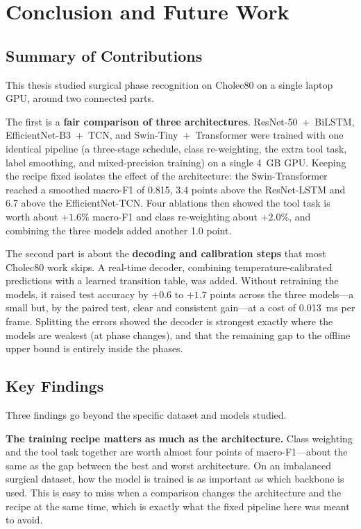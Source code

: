 \chapter{Conclusion and Future Work}

\section{Summary of Contributions}

This thesis studied surgical phase recognition on Cholec80 on a single laptop GPU, around two connected parts.

The first is a \textbf{fair comparison of three architectures}. ResNet-50~+~BiLSTM, EfficientNet-B3~+~TCN, and Swin-Tiny~+~Transformer were trained with one identical pipeline (a three-stage schedule, class re-weighting, the extra tool task, label smoothing, and mixed-precision training) on a single 4~GB GPU. Keeping the recipe fixed isolates the effect of the architecture: the Swin-Transformer reached a smoothed macro-F1 of 0.815, 3.4 points above the ResNet-LSTM and 6.7 above the EfficientNet-TCN. Four ablations then showed the tool task is worth about $+1.6\%$ macro-F1 and class re-weighting about $+2.0\%$, and combining the three models added another 1.0 point.

The second part is about the \textbf{decoding and calibration steps} that most Cholec80 work skips. A real-time decoder, combining temperature-calibrated predictions with a learned transition table, was added. Without retraining the models, it raised test accuracy by $+0.6$ to $+1.7$ points across the three models---a small but, by the paired test, clear and consistent gain---at a cost of 0.013~ms per frame. Splitting the errors showed the decoder is strongest exactly where the models are weakest (at phase changes), and that the remaining gap to the offline upper bound is entirely inside the phases.

\section{Key Findings}

Three findings go beyond the specific dataset and models studied.

\textbf{The training recipe matters as much as the architecture.} Class weighting and the tool task together are worth almost four points of macro-F1---about the same as the gap between the best and worst architecture. On an imbalanced surgical dataset, how the model is trained is as important as which backbone is used. This is easy to miss when a comparison changes the architecture and the recipe at the same time, which is exactly what the fixed pipeline here was meant to avoid.

